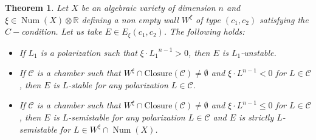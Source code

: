 \documentclass[11pt,twoside]{amsart}
\newtheorem{theorem}{Theorem}[section]
\theoremstyle{definition}
\newcommand {\Closure}{\mathrm{Closure}}
\newcommand{\Num}{\operatorname{Num}}
\begin{document}
\begin{theorem}
\label{th_Exi}
    Let $X$ be an algebraic variety of dimension $n$ and $\xi\in\Num(X)\otimes\mathbb{R}$ defining a non empty wall $W^{\xi}$ of type $(c_1,c_2)$ satisfying the $C-$condition. Let us take $E\in E_{\xi}(c_1,c_2)$. The following holds: %
    \begin{itemize}
      
   
    

       \item[i)] If $L_1$ is a polarization such that $\xi\cdot {L_1}^{n-1}>0$, then $E$ is $L_1$-unstable.

     \item[ii)]  If $\mathcal{C}$ is a chamber such that $W^{\xi}\cap \Closure(\mathcal{C})\neq\emptyset$ and $\xi\cdot L^{n-1}<0$ for $L\in\mathcal{C}$, then $E$ is $L$-stable for any polarization $L\in\mathcal{C}$.
 \item[iii)]  If $\mathcal{C}$ is a chamber such that $W^{\xi}\cap \Closure(\mathcal{C})\neq\emptyset$ and $\xi\cdot L^{n-1}\leq 0$ for $L\in \mathcal{C}$, then $E$ is $L$-semistable for any polarization $L\in\mathcal{C}$ and $E$ is strictly $L$-semistable for $L\in W^{\xi}\cap\Num(X)$.
    \end{itemize}


    
\end{theorem}
\end{document}
